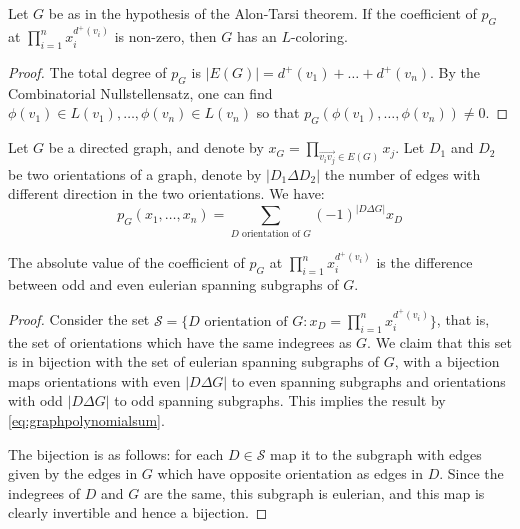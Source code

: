 \begin{proposition}
\label{polynomialatproposition}
Let $G$ be as in the hypothesis of the Alon-Tarsi theorem.
If the coefficient of $p_G$ at $\prod_{i=1}^n x_i^{d^+(v_i)}$ is non-zero, then $G$ has an $L$-coloring.
\end{proposition}
\begin{proof}
The total degree of $p_G$ is $|E(G)| = d^+(v_1) + \ldots + d^+(v_n)$. By the Combinatorial Nullstellensatz, 
one can find $\phi(v_1) \in L(v_1), \ldots, \phi(v_n) \in L(v_n)$ so that $p_G(\phi(v_1), \ldots, \phi(v_n)) \neq 0$.
\end{proof}

\begin{observation}
Let $G$ be a directed graph, and denote by $x_G = \prod_{\overrightarrow{v_iv_j} \in E(G)} x_j$. Let $D_1$ and $D_2$ be two orientations of a graph, denote by
$|D_1 \Delta D_2|$ the number of edges with different direction in the two orientations. We have:
\begin{equation}
\label{eq:graphpolynomialsum}
p_G(x_1, \ldots, x_n) = \sum_{D \text{ orientation of } G} (-1)^{|D\Delta G|} x_D
\end{equation}
\end{observation}

\begin{proposition}
\label{proplastalontarsi}
The absolute value of the coefficient of $p_G$ at $\prod_{i=1}^n x_i^{d^+(v_i)}$ is the difference between odd and even eulerian spanning subgraphs of $G$.
\end{proposition}

\begin{proof}
Consider the set $\mathcal{S} = \{D \text{ orientation of } G : x_D = \prod_{i=1}^n x_i^{d^+(v_i)} \}$, that is, 
the set of orientations which have the same indegrees as $G$. We claim that this set is in bijection 
with the set of eulerian spanning subgraphs of $G$, with a bijection maps orientations with even 
$|D\Delta G|$ to even spanning subgraphs and orientations with odd $|D\Delta G|$ to odd spanning
subgraphs. This implies the result by \eqref{eq:graphpolynomialsum}.

The bijection is as follows: for each $D \in \mathcal{S}$ map it to the subgraph with edges given by 
the edges in $G$ which have opposite orientation as edges in $D$. Since the indegrees of $D$ and $G$ are 
the same, this subgraph is eulerian, and this map is clearly invertible and hence a bijection. 
\end{proof}

